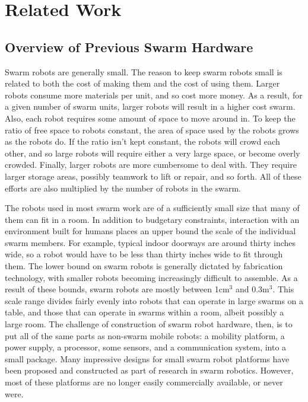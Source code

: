\chapter{Related Work}

\section{Overview of Previous Swarm Hardware}

Swarm robots are generally small. 
The reason to keep swarm robots small is related to both the cost of making them and the cost of using them. 
Larger robots consume more materials per unit, and so cost more money.
As a result, for a given number of swarm units, larger robots will result in a higher cost swarm. 
Also, each robot requires some amount of space to move around in. 
To keep the ratio of free space to robots constant, the area of space used by the robots grows as the robots do. 
If the ratio isn't kept constant, the robots will crowd each other, and so large robots will require either a very large space, or become overly crowded.
Finally, larger robots are more cumbersome to deal with. 
They require larger storage areas, possibly teamwork to lift or repair, and so forth. 
All of these efforts are also multiplied by the number of robots in the swarm. 

The robots used in most swarm work are of a sufficiently small size that many of them can fit in a room. In addition to budgetary constraints, interaction with an environment built for humans places an upper bound the scale of the individual swarm members. 
For example, typical indoor doorways are around thirty inches wide, so a robot would have to be less than thirty inches wide to fit through them. 
The lower bound on swarm robots is generally dictated by fabrication technology, with smaller robots becoming increasingly difficult to assemble. 
As a result of these bounds, swarm robots are mostly between 1cm$^3$ and 0.3m$^3$. 
This scale range divides fairly evenly into robots that can operate in large swarms on a table, and those that can operate in swarms within a room, albeit possibly a large room. 
The challenge of construction of swarm robot hardware, then, is to put all of the same parts as non-swarm mobile robots: a mobility platform, a power supply, a processor, some sensors, and a communication system, into a small package.
Many impressive designs for small swarm robot platforms have been proposed and constructed as part of research in swarm robotics. 
However, most of these platforms are no longer easily commercially available, or never were. 

